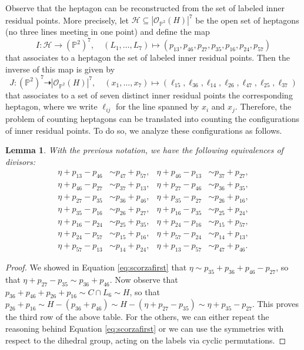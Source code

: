 \documentclass[12pt]{article}
\newtheorem{lemma}[theorem]{Lemma}
\numberwithin{equation}{section}
\theoremstyle{definition}
\begin{document}
Observe that the heptagon can be reconstructed from the set of labeled inner residual points. More precisely, let $\mathcal{H}\subseteq |\mathcal{O}_{\mathbb{P}^2}(H)|^7$ be the open set of heptagons (no three lines meeting in one point) and define the map
\begin{equation}\label{eq:matoinnerpoints} 
I \colon \mathcal{H} \longrightarrow (\mathbb{P}^2)^7, \quad (L_1,\dots,L_7) \mapsto (
p_{13},p_{46},p_{27},p_{35},p_{16},p_{24},p_{57})  
\end{equation}
that associates to a heptagon the set of labeled inner residual points. Then the inverse of this map is given by 
\begin{equation}\label{eq:maptoheptagons}
J\colon (\mathbb{P}^2)^7 \dashrightarrow |\mathcal{O}_{\mathbb{P}^2}(H)|^7, \quad (x_1,\dots,x_7) \mapsto (\ell_{15},\ell_{36},\ell_{14},\ell_{26},\ell_{47},\ell_{25},\ell_{37})
\end{equation}
that associates to a set of seven distinct inner residual points the corresponding heptagon, where we write $\ell_{ij}$ for the line spanned by $x_i$ and $x_j$. Therefore, the problem of counting heptagons can be translated into counting the configurations of inner residual points. To do so, we analyze these configurations as follows.

\begin{lemma}\label{lemma:scorzaall} 
	With the previous notation, we have the following equivalences of divisors:
	\begin{align*}
	\eta+p_{13}-p_{46} &\sim p_{47} + p_{57}, & \eta+p_{46}-p_{13} &\sim p_{37} + p_{27}, \\
	\eta+p_{46}-p_{27} &\sim p_{37} + p_{13}, & \eta+p_{27}-p_{46} &\sim p_{36} + p_{35}, \\
	\eta+p_{27}-p_{35} &\sim p_{36} + p_{46}, & \eta+p_{35}-p_{27} &\sim p_{26} + p_{16}, \\
	\eta+p_{35}-p_{16} &\sim p_{26} + p_{27}, & \eta+p_{16}-p_{35} &\sim p_{25} + p_{24}, \\
	\eta+p_{16}-p_{24} &\sim p_{25} + p_{35}, & \eta+p_{24}-p_{16} &\sim p_{15} + p_{57}, \\
	\eta+p_{24}-p_{57} &\sim p_{15} + p_{16}, & \eta+p_{57}-p_{24} &\sim p_{14} + p_{13}, \\
	\eta+p_{57}-p_{13} &\sim p_{14} + p_{24}, & \eta+p_{13}-p_{57} &\sim p_{47} + p_{46}. 
	\end{align*}
\end{lemma}
\begin{proof}
	We showed in Equation \eqref{eq:scorzafirst} that $\eta \sim p_{35}+p_{36}+p_{46}-p_{27}$, so that $\eta+p_{27}-p_{35} \sim p_{36}+p_{46}$.  Now observe that $p_{36}+p_{46}+p_{26}+p_{16} \sim C\cap L_6 \sim H$, so that $p_{26}+p_{16}\sim H-(p_{36}+p_{46}) \sim H-(\eta+p_{27}-p_{35}) \sim \eta+p_{35}-p_{27}$.  This proves the third row of the above table. For the others, we can either repeat the reasoning behind Equation \eqref{eq:scorzafirst} or we can use the symmetries with respect to the dihedral group, acting on the labels via cyclic permutations. 
\end{proof} 
\end{document}
